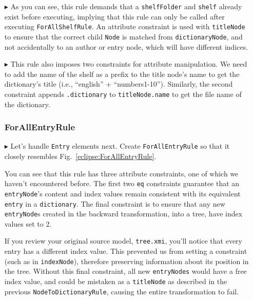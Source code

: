\begin{itemize}
\newpage

\item[$\blacktriangleright$] As you can see, this rule demands that a \texttt{shelfFolder} and \texttt{shelf} already exist before executing, implying that this
rule can only be called after executing \texttt{ForAllShelfRule}. An attribute constraint is used with \texttt{titleNode} to ensure that the correct child
\texttt{Node} is matched from \texttt{dictionaryNode}, and not accidentally to an author or entry node, which will have different indices.

\item[$\blacktriangleright$] This rule also imposes two constraints for attribute manipulation. We need to add the name of the shelf as a prefix to the title
node's name to get the dictionary's title (i.e., ``english'' + ``numbers1-10''). Similarly, the second constraint appends \texttt{.dictionary} to
\texttt{titleNode.name} to get the file name of the dictionary.

\subsubsection{ForAllEntryRule} %

\item[$\blacktriangleright$] Let's handle \texttt{Entry} elements next. Create \texttt{ForAllEntryRule} so that it closely resembles
Fig.~\ref{eclipse:ForAllEntryRule}.

\vspace{0.5cm}

You can see that this rule has three attribute constraints, one of which we haven't encountered before. The first two \texttt{eq} constraints guarantee that
an \texttt{entryNode}'s content and index values remain consistent with its equivalent \texttt{entry} in a \texttt{dictionary}. The final constraint is to
ensure that any new \texttt{entryNode}s created in the backward transformation, into a tree, have index values set to 2. 

\vspace{0.5cm}

If you review your original source model,
\texttt{tree.xmi}, you'll notice that every entry has a different index value. This prevented us from setting a constraint (such as in \texttt{indexNode}),
therefore preserving information about its position in the tree. Without this final constraint, all new \texttt{entryNodes} would have a free index value, and
could be mistaken as a \texttt{titleNode} as described in the previous \texttt{NodeToDictionaryRule}, causing the entire transformation to fail.


\end{itemize}
